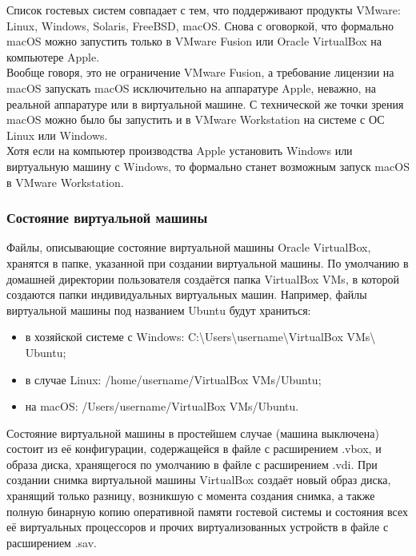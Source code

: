 \documentclass[14pt, a4paper]{article}
\begin{document}
Список гостевых систем совпадает с тем, что поддерживают продукты VMware: Linux, Windows,
Solaris, FreeBSD, macOS. Снова с оговоркой, что формально macOS можно запустить только в
VMware Fusion или Oracle VirtualBox на компьютере Apple.\\

Вообще говоря, это не ограничение VMware Fusion, а требование лицензии на macOS запускать
macOS исключительно на аппаратуре Apple, неважно, на реальной аппаратуре или в виртуальной
машине. С технической же точки зрения macOS можно было бы запустить и в VMware Workstation на
системе с ОС Linux или Windows.\\

Хотя если на компьютер производства Apple установить Windows или виртуальную машину с
Windows, то формально станет возможным запуск macOS в VMware Workstation.

\subsubsection*{Состояние виртуальной машины} 

Файлы, описывающие состояние виртуальной машины Oracle VirtualBox, хранятся в папке, указанной
при создании виртуальной машины. По умолчанию в домашней директории пользователя создаётся
папка VirtualBox VMs, в которой создаются папки индивидуальных виртуальных машин. Например,
файлы виртуальной машины под названием Ubuntu будут храниться:

\begin{itemize}
    \item в хозяйской системе с Windows: \colorbox{backcolour}{C:\textbackslash Users\textbackslash username\textbackslash VirtualBox VMs\textbackslash} \\ \colorbox{backcolour}{Ubuntu};
    \item в случае Linux: \colorbox{backcolour}{/home/username/VirtualBox VMs/Ubuntu};
    \item на macOS: \colorbox{backcolour}{/Users/username/VirtualBox VMs/Ubuntu}.
\end{itemize}

Состояние виртуальной машины в простейшем случае (машина выключена) состоит из её
конфигурации, содержащейся в файле с расширением .vbox, и образа диска, хранящегося по
умолчанию в файле с расширением .vdi. При создании снимка виртуальной машины VirtualBox
создаёт новый образ диска, хранящий только разницу, возникшую с момента создания снимка, а
также полную бинарную копию оперативной памяти гостевой системы и состояния всех её
виртуальных процессоров и прочих виртуализованных устройств в файле с расширением .sav.\\
\end{document}
